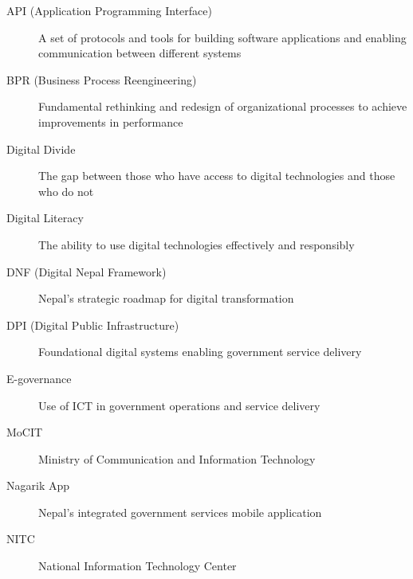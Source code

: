 \documentclass[12pt,a4paper]{article}
\begin{document}
\begin{description}
    \item[API (Application Programming Interface)] A set of protocols and tools for building software applications and enabling communication between different systems
    
    \item[BPR (Business Process Reengineering)] Fundamental rethinking and redesign of organizational processes to achieve improvements in performance
    
    \item[Digital Divide] The gap between those who have access to digital technologies and those who do not
    
    \item[Digital Literacy] The ability to use digital technologies effectively and responsibly
    
    \item[DNF (Digital Nepal Framework)] Nepal's strategic roadmap for digital transformation
    
    \item[DPI (Digital Public Infrastructure)] Foundational digital systems enabling government service delivery
    
    \item[E-governance] Use of ICT in government operations and service delivery
    
    \item[MoCIT] Ministry of Communication and Information Technology
    
    \item[Nagarik App] Nepal's integrated government services mobile application
    
    \item[NITC] National Information Technology Center
\end{description}
\end{document}
